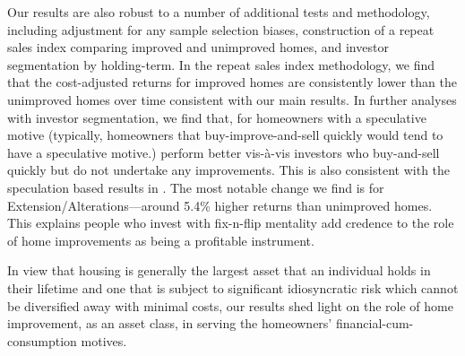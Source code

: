 \documentclass[AEJ,reqno, draftmode]{AEA} %
\begin{document}
Our results are also robust to a number of additional tests and methodology, including adjustment for any sample selection biases, construction of a repeat sales index comparing improved and unimproved homes, and investor segmentation by holding-term. In the repeat sales index methodology, we find that the cost-adjusted returns for improved homes are consistently lower than the unimproved homes over time consistent with our main results. In further analyses with investor segmentation, we find that, for homeowners with a speculative motive (typically, homeowners that buy-improve-and-sell quickly would tend to have a speculative motive.) perform better vis-à-vis investors who buy-and-sell quickly but do not undertake any improvements. This is also consistent with the speculation based results in \citet{choi2014speculating}. The most notable change we find is for Extension/Alterations---around 5.4\% higher returns than unimproved homes. This explains people who invest with fix-n-flip mentality add credence to the role of home improvements as being a profitable instrument.





In view that housing is generally the largest asset that an individual holds in their lifetime and one that is subject to significant idiosyncratic risk which cannot be diversified away with minimal costs, our results shed light on the role of home improvement, as an asset class, in serving the homeowners' financial-cum-consumption motives.
\end{document}
